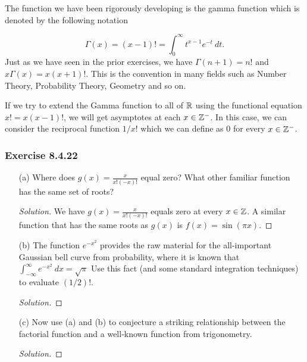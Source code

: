 The function we have been rigorously developing is the gamma function which is denoted by the following notation

\[  \Gamma(x) = (x-1)! = \int_{ 0 }^{ \infty  }  t^{x-1} e^{-t } \ dt. \] 
Just as we have seen in the prior exercises, we have \( \Gamma(n+1) = n!   \) and \( x\Gamma(x) = x(x+1)! \). This is the convention in many fields such as Number Theory, Probability Theory, Geometry and so on.

If we try to extend the Gamma function to all of \( \mathbb{R}  \) using the functional equation \(  x! = x (x-1)! \), we will get asymptotes at each \( x \in  \mathbb{Z}^{-} \). In this case, we can consider the reciprocal function \( 1 / x!  \) which we can define as \( 0  \) for every \( x \in \mathbb{Z}^{- } \).

\subsubsection{Exercise 8.4.22}
\begin{enumerate}
    \item[(a)] Where does \( g(x)  = \frac{ x }{ x! (-x)! }  \) equal zero? What other familiar function has the same set of roots? 
        \begin{proof}[Solution]
        We have \( g(x) = \frac{ x }{ x! (-x)! }  \) equals zero at every \(  x \in \mathbb{Z}  \). A similar function that has the same roots as \( g(x)  \) is \( f(x) = \sin(\pi x) \). 
        \end{proof}
    \item[(b)] The function \( e^{-x ^{2}}  \) provides the raw material for the all-important Gaussian bell curve from probability, where it is known that \( \int_{ -\infty  }^{ \infty  }  e^{-x ^{2}} \ dx = \sqrt{ \pi  }   \) Use this fact (and some standard integration techniques) to evaluate \( (1/2)! \).
        \begin{proof}[Solution]
        
        \end{proof}
    \item[(c)] Now use (a) and (b) to conjecture a striking relationship between the factorial function and a well-known function from trigonometry. 
       \begin{proof}[Solution]
       
       \end{proof} 
\end{enumerate}

